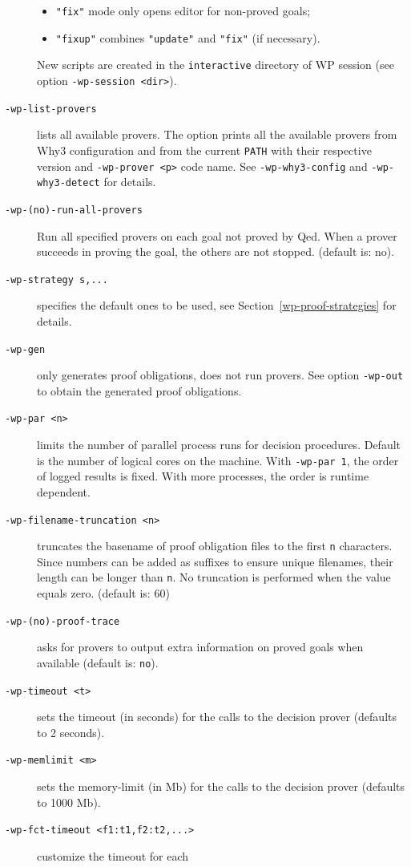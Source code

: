 \begin{description}
\begin{itemize}
  \item \texttt{"fix"} mode only opens editor for non-proved goals;
  \item \texttt{"fixup"} combines \texttt{"update"} and \texttt{"fix"} (if necessary).
  \end{itemize}
  New scripts are created in the \texttt{interactive} directory of \textsf{WP}
  session (see option \texttt{-wp-session <dir>}).
\item[\tt -wp-list-provers] lists all available provers.
  The option prints all the available provers from \textsf{Why3} configuration and from
  the current \texttt{PATH} with their respective version and \verb+-wp-prover <p>+
  code name. See \verb+-wp-why3-config+ and \verb+-wp-why3-detect+ for
  details.
\item[\tt -wp-(no)-run-all-provers] Run all specified provers on each goal not
  proved by Qed. When a prover succeeds in proving the goal, the others are not
  stopped. (default is: no).
\item[\tt -wp-strategy s,...] specifies the default
  ones to be used, see Section~\ref{wp-proof-strategies} for details.
\item[\tt -wp-gen] only generates proof obligations, does not run provers.
  See option \texttt{-wp-out} to obtain the generated proof obligations.
\item[\tt -wp-par <n>] limits the number of parallel process runs for
  decision procedures. Default is the number of logical cores on the machine.
  With \texttt{-wp-par~1}, the order of logged results is fixed. With more
  processes, the order is runtime dependent.
\item[\tt -wp-filename-truncation <n>] truncates the basename of proof
  obligation files to the first \texttt{n} characters.
  Since numbers can be added as suffixes to ensure unique filenames,
  their length can be longer than \texttt{n}.
  No truncation is performed when the value equals zero. (default is: 60)
\item[\tt -wp-(no)-proof-trace] asks for provers to output extra information
  on proved goals when available (default is: \texttt{no}).
\item[\tt -wp-timeout <t>] sets the timeout (in seconds) for the calls
  to the decision prover (defaults to 2 seconds).
\item[\tt -wp-memlimit <m>] sets the memory-limit (in Mb) for the calls
  to the decision prover (defaults to 1000 Mb).
\item[\tt -wp-fct-timeout <f1:t1,f2:t2,...>] customize the timeout for each

\end{description}
